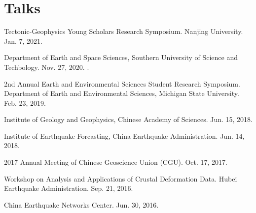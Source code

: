 \section*{Talks}

\begin{etaremune}
\item
	Tectonic-Geophysics Young Scholars Research Symposium.
	Nanjing University.
	Jan. 7, 2021.
\item
	Department of Earth and Space Sciences, Southern University of Science and Techbology.
	Nov. 27, 2020.
	\invited.
\item
    2nd Annual Earth and Environmental Sciences Student Research Symposium.
    Department of Earth and Environmental Sciences, Michigan State University.
    Feb. 23, 2019.
\item
    Institute of Geology and Geophysics, Chinese Academy of Sciences.
    Jun. 15, 2018.
    \invited
\item
    Institute of Earthquake Forcasting, China Earthquake Administration.
    Jun. 14, 2018.
\item
    2017 Annual Meeting of Chinese Geoscience Union (CGU).
    Oct. 17, 2017.
    \invited
\item
    Workshop on Analysis and Applications of Crustal Deformation Data.
    Hubei Earthquake Administration.
    Sep. 21, 2016.
    \invited
\item
    China Earthquake Networks Center.
    Jun. 30, 2016.
    \invited
\end{etaremune}

